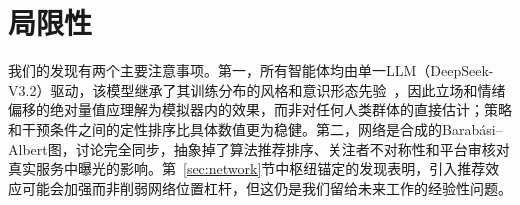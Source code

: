 \section{局限性}
\label{sec:limitations}

我们的发现有两个主要注意事项。第一，所有智能体均由单一LLM（DeepSeek-V3.2）驱动，该模型继承了其训练分布的风格和意识形态先验~\citep{taubenfeld-etal-2024-systematic}，因此立场和情绪偏移的绝对量值应理解为模拟器内的效果，而非对任何人类群体的直接估计；策略和干预条件之间的定性排序比具体数值更为稳健。第二，网络是合成的Barab\'{a}si--Albert图，讨论完全同步，抽象掉了算法推荐排序、关注者不对称性和平台审核对真实服务中曝光的影响。第~\ref{sec:network}节中枢纽锚定的发现表明，引入推荐效应可能会加强而非削弱网络位置杠杆，但这仍是我们留给未来工作的经验性问题。
